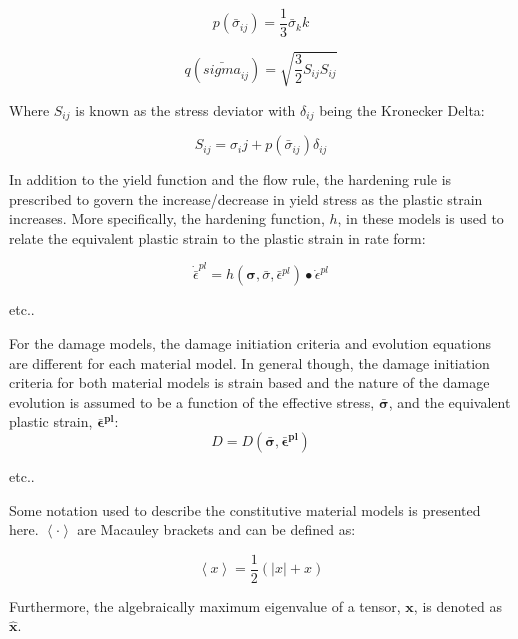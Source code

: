 \begin{equation}
p\left(\bar{\sigma}_{ij}\right)=\frac{1}{3}\bar{\sigma}_kk
\label{eqn:druc3}
\end{equation}

\begin{equation}
q\left(\bar{sigma}_{ij}\right)=\sqrt{\frac{3}{2}S_{ij}S_{ij}}\label{eqn:druc4}
\end{equation}

Where $S_{ij}$ is known as the stress deviator with $\delta_{ij}$ being the Kronecker Delta:

\begin{equation}
S_{ij} = \sigma_ij + p\left(\bar{\sigma}_{ij}\right)\delta_{ij}
\end{equation}

In addition to the yield function and the flow rule, the hardening rule is prescribed to govern the increase/decrease in yield stress as the plastic strain increases. More specifically, the hardening function, $h$, in these models is used to relate the equivalent plastic strain to the plastic strain in rate form: 

\begin{equation}
    \dot{\bar{\epsilon}}^{pl} 
    = 
    h
    \left(
        \boldsymbol{\sigma}, \bar{\sigma}, \bar{\epsilon}^{pl}
    \right)
    \bullet \dot{\epsilon}^{pl}
\label{eqn:const8d}
\end{equation}

etc..

For the damage models, the damage initiation criteria and evolution equations are different for each material model. In general though, the damage initiation criteria for both material models is strain based and the nature of the damage evolution is assumed to be a function of the effective stress, $\boldsymbol{\bar{\sigma}}$, and the equivalent plastic strain, $\boldsymbol{\bar{\epsilon}^{pl}}$:
\begin{equation}
D=D(\boldsymbol{\bar{\sigma}},\boldsymbol{\bar{\epsilon}^{pl}})\label{eqn:const8}
\end{equation}



etc..

Some notation used to describe the constitutive material models is presented here. $\left\langle \cdotp\right\rangle $ are Macauley brackets and can be defined as:

\begin{equation}
\left\langle x\right\rangle =\frac{1}{2}\left(\left|x\right|+x\right)\label{eqn:const9-3}
\end{equation}

Furthermore, the algebraically maximum eigenvalue of a tensor, $\mathbf{x}$, is denoted as $\hat{\mathbf{x}}$.



